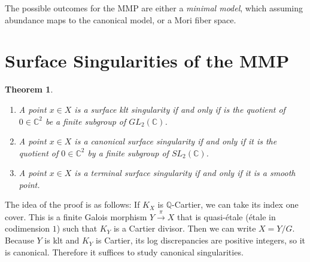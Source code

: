 \documentclass[leqno, openany]{memoir}
\newtheorem{thm}{Theorem}[section]
\theoremstyle{definition}
\theoremstyle{remark}
\theoremstyle{plain}
\theoremstyle{definition}
\theoremstyle{remark}
\newcommand{\C}{\mathbb{C}}
\newcommand{\Q}{\mathbb{Q}}
\begin{document}
The possible outcomes for the MMP are either a \textit{minimal model}, which assuming abundance maps to the canonical model, or a Mori fiber space.

\section{Surface Singularities of the MMP}%
\label{sec:surface_singularities_of_the_mmp}

\begin{thm}\leavevmode
    \begin{enumerate}
        \item A point $x \in X$ is a surface klt singularity if and only if is the quotient of $0 \in \C^2$ be a finite subgroup of $GL_2(\C)$.
        \item A point $x \in X$ is a canonical surface singularity if and only if it is the quotient of $0 \in \C^2$ by a finite subgroup of $SL_2(\C)$.
        \item A point $x \in X$ is a terminal surface singularity if and only if it is a smooth point.
    \end{enumerate}
\end{thm}

The idea of the proof is as follows: If $K_X$ is $\Q$-Cartier, we can take its index one cover. This is a finite Galois morphism $Y \xrightarrow{\pi} X$ that is quasi-\'etale (\'etale in codimension $1$) such that $K_Y$ is a Cartier divisor. Then we can write $X = Y/G$. Because $Y$ is klt and $K_Y$ is Cartier, its log discrepancies are positive integers, so it is canonical. Therefore it suffices to study canonical singularities.
\end{document}
